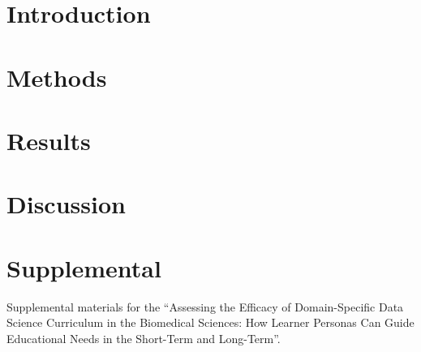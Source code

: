\documentclass[../main.tex]{subfiles}
\begin{document}
    \section{Introduction}

        

    \section{Methods}

        

    \section{Results}

        

    \section{Discussion}

        

    \section{Supplemental}

        Supplemental materials for the
        ``Assessing the Efficacy of Domain-Specific Data Science Curriculum in the Biomedical Sciences:
          How Learner Personas Can Guide Educational Needs in the Short-Term and Long-Term''.

        
\end{document}
